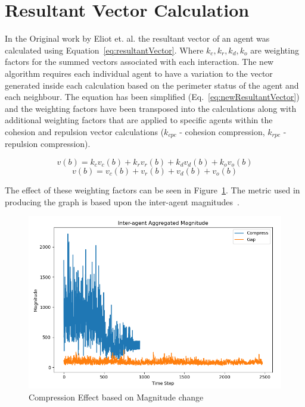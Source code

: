 \documentclass[12pt,a4paper]{article}
\begin{document}
\section{Resultant Vector Calculation}
In the Original work by Eliot et. al. the resultant vector of an agent was calculated using Equation~\ref{eq:resultantVector}. Where $k_c,k_r,k_d,k_o$ are weighting factors for the summed vectors associated with each interaction. The new algorithm requires each individual agent to have a variation to the vector generated inside each calculation based on the perimeter status of the agent and each neighbour. The equation has been simplified (Eq.~\ref{eq:newResultantVector}) and the weighting factors have been transposed into the calculations along with additional weighting factors that are applied to specific agents within the cohesion and repulsion vector calculations ($k_{cpc}$ - cohesion compression, $k_{rpc}$ - repulsion compression).

\begin{equation}\label{eq:resultantVector}
	v(b) = k_cv_c(b) + k_rv_r(b) + k_dv_d(b) + k_ov_o(b)
\end{equation}
\begin{equation}\label{eq:newResultantVector}
	v(b) = v_c(b) + v_r(b) + v_d(b) + v_o(b)
\end{equation}

The effect of these weighting factors can be seen in Figure~\ref{fig:compressioneffect1}. The metric used in producing the graph is based upon the inter-agent magnitudes~\cite{eliot2018metric}.

\begin{figure}[H]
	\centering
	\includegraphics[width=0.75\linewidth]{figures/CompressionEffect1}
	\caption[Compression Effect]{Compression Effect based on Magnitude change}
	\label{fig:compressioneffect1}
\end{figure}
\end{document}
